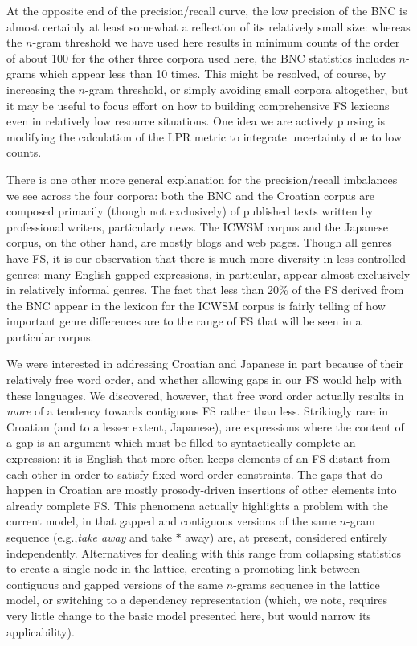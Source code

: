 \documentclass[11pt,letterpaper]{article}
\makeatletter
\def \eg {e.g.,\@ }
\newcommand{\gap}{$*$\xspace}
\newcommand{\ex}[1]{\textit{#1}\xspace}
\makeatother
\begin{document}
At the opposite end of the precision/recall curve, the low precision of the BNC is almost certainly at least somewhat a reflection of its relatively small size: whereas the $n$-gram threshold we have used here results in minimum counts of the order of about 100 for the other three corpora used here, the BNC statistics includes $n$-grams which appear less than 10 times. This might be resolved, of course, by increasing the $n$-gram threshold, or simply avoiding small corpora altogether, but it may be useful to focus effort on how to building comprehensive FS lexicons even in relatively low resource situations. One idea we are actively pursing is modifying the calculation of the LPR metric to integrate uncertainty due to low counts.

There is one other more general explanation for the precision/recall imbalances we see across the four corpora: both the BNC and the Croatian corpus are composed primarily (though not exclusively) of published texts written by professional writers, particularly news. The ICWSM corpus and the Japanese corpus, on the other hand, are mostly blogs and web pages. Though all genres have FS, it is our observation that there is much more diversity in less controlled genres: many English gapped expressions, in particular, appear almost exclusively in relatively informal genres. The fact that less than 20\% of the FS derived from the BNC appear in the lexicon for the ICWSM corpus is fairly telling of how important genre differences are to the range of FS that will be seen in a particular corpus.

We were interested in addressing Croatian and Japanese in part because of their relatively free word order, and whether allowing gaps in our FS would help with these languages. We discovered, however, that free word order actually results in \emph{more} of a tendency towards contiguous FS rather than less. Strikingly rare in Croatian (and to a lesser extent, Japanese), are expressions where the content of a gap is an argument which must be filled to syntactically complete an expression: it is English that more often keeps elements of an FS distant from each other in order to satisfy fixed-word-order constraints. The gaps that do happen in Croatian are mostly prosody-driven insertions of other elements into already complete FS. This phenomena actually highlights a problem with the current model, in that gapped and contiguous versions  of the same $n$-gram sequence (\eg \ex{take away} and {take \gap away}) are, at present, considered entirely independently. Alternatives for dealing with this range from collapsing statistics to create a single node in the lattice, creating a promoting link between contiguous and gapped versions of the same $n$-grams sequence in the lattice model, or switching to a dependency representation (which, we note, requires very little change to the basic model presented here, but would narrow its applicability). 
\end{document}
